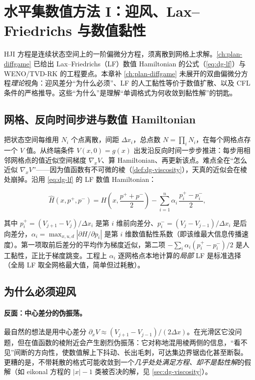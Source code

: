 \section{水平集数值方法 I：迎风、Lax--Friedrichs 与数值黏性}
\label{sec:hj-numerics}

HJI 方程是连续状态空间上的一阶偏微分方程，须离散到网格上求解。\cref{ch:plan-diffgame} 已给出 Lax--Friedrichs（LF）数值 Hamiltonian 的公式（\cref{eq:dg-lf}）与 WENO/TVD-RK 的工程要点。本章补 \cref{ch:plan-diffgame} 未展开的双曲偏微分方程\emph{理论}视角：迎风差分“为什么必须”、LF 的人工黏性等价于数值扩散、以及 CFL 条件的严格推导。这些“为什么”是理解“单调格式为何收敛到黏性解”的钥匙。

\subsection{网格、反向时间步进与数值 Hamiltonian}
\label{sec:hj-grid}

把状态空间每维用 $N_i$ 个点离散，间距 $\Delta x_i$，总点数 $N=\prod_i N_i$，在每个网格点存一个 $V$ 值。从终端条件 $V(x,0)=g(x)$ 出发沿反向时间一步步推进：每步用相邻网格点的值近似空间梯度 $\nabla_xV$、算 Hamiltonian、再更新该点。难点全在“怎么近似 $\nabla_xV$”——因为值函数有不可微的棱（\cref{def:dg-viscosity}），天真的近似会在棱处崩掉。沿用 \cref{eq:dg-lf} 的 LF 数值 Hamiltonian：

\begin{equation}
  \hat H(x,p^+,p^-)=H\!\left(x,\frac{p^++p^-}{2}\right)-\sum_{i=1}^{n}\alpha_i\,\frac{p_i^+-p_i^-}{2},
  \label{eq:hj-lf}
\end{equation}

其中 $p_i^+=(V_{j+1}-V_j)/\Delta x_i$ 是第 $i$ 维前向差分、$p_i^-=(V_j-V_{j-1})/\Delta x_i$ 是后向差分，$\alpha_i=\max_{x,u,d}|\partial H/\partial p_i|$ 是第 $i$ 维数值黏性系数（即该维最大信息传播速度）。第一项取前后差分的平均作为梯度近似，第二项 $-\sum_i\alpha_i(p_i^+-p_i^-)/2$ 是人工黏性，正比于梯度跳变。工程上 $\alpha_i$ 逐网格点本地计算的\emph{局部} LF 是标准选择（全局 LF 取全网格最大值，简单但过耗散）。

\subsection{为什么必须迎风}
\label{sec:hj-upwind}

\paragraph{反面：中心差分的伪振荡。}
最自然的想法是用中心差分 $\partial_xV\approx(V_{j+1}-V_{j-1})/(2\Delta x)$。在光滑区它没问题，但在值函数的棱附近会产生剧烈伪振荡：它对称地混用棱两侧的信息，“看不见”间断的方向性，使数值解上下抖动、长出毛刺，可达集边界锯齿化甚至断裂。更糟的是，不带耗散的格式可能收敛到一个\emph{几乎处处满足方程、却不是黏性解}的假解（如 eikonal 方程的 $|x|-1$ 类被否决的解，见 \cref{sec:dg-viscosity}）。


